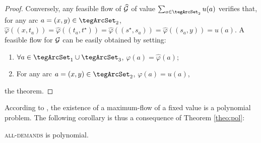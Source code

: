 \begin{bibunit}[ieeetr]
\begin{proof}
Conversely, any feasible flow of $\widehat{\cal G}$ of value $\sum_{a\in \tegArcSet_2} u(a)$ verifies
that, for any arc $a=(x,y)\in \tegArcSet_2$, 
$\widehat{\varphi}((x,t_a))=\widehat{\varphi}((t_a,t^\star))=\widehat{\varphi}((s^\star, s_a))=\widehat{\varphi}( (s_a,y))=u(a)$.
A feasible flow for ${\cal G}$ can be easily obtained by setting:
\begin{enumerate}
\item
$\forall a\in \tegArcSet_1 \cup \tegArcSet_3$, 
${\varphi}(a)=\widehat{\varphi}(a)$;
\item
For any arc $a=(x,y)\in \tegArcSet_2$, $\varphi(a)=u(a)$,
\end{enumerate}
the theorem.
\end{proof}

According to \cite{ahuja1993}, the existence of a maximum-flow of a fixed value is a polynomial problem. The following corollary is thus a consequence
of Theorem \ref{theo:pol}:
\begin{corollary}
\textsc{all-demands} is polynomial.
\end{corollary}

\newpage
{}
\renewcommand{\bibname}{Bibliography of chapter \thechapter}
\end{bibunit}
